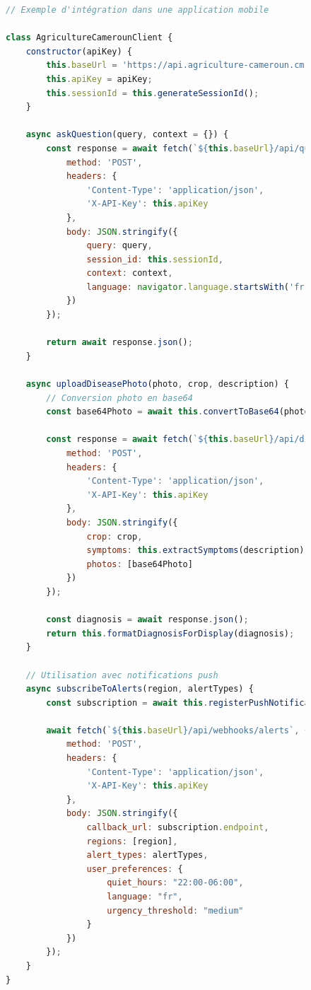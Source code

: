 \begin{figure}[H]
\centering
\begin{lstlisting}[language=JavaScript, caption=Intégration JavaScript de l'API]
// Exemple d'intégration dans une application mobile

class AgricultureCamerounClient {
    constructor(apiKey) {
        this.baseUrl = 'https://api.agriculture-cameroun.cm';
        this.apiKey = apiKey;
        this.sessionId = this.generateSessionId();
    }

    async askQuestion(query, context = {}) {
        const response = await fetch(`${this.baseUrl}/api/query`, {
            method: 'POST',
            headers: {
                'Content-Type': 'application/json',
                'X-API-Key': this.apiKey
            },
            body: JSON.stringify({
                query: query,
                session_id: this.sessionId,
                context: context,
                language: navigator.language.startsWith('fr') ? 'fr' : 'en'
            })
        });

        return await response.json();
    }

    async uploadDiseasePhoto(photo, crop, description) {
        // Conversion photo en base64
        const base64Photo = await this.convertToBase64(photo);

        const response = await fetch(`${this.baseUrl}/api/diagnose`, {
            method: 'POST',
            headers: {
                'Content-Type': 'application/json',
                'X-API-Key': this.apiKey
            },
            body: JSON.stringify({
                crop: crop,
                symptoms: this.extractSymptoms(description),
                photos: [base64Photo]
            })
        });

        const diagnosis = await response.json();
        return this.formatDiagnosisForDisplay(diagnosis);
    }

    // Utilisation avec notifications push
    async subscribeToAlerts(region, alertTypes) {
        const subscription = await this.registerPushNotifications();

        await fetch(`${this.baseUrl}/api/webhooks/alerts`, {
            method: 'POST',
            headers: {
                'Content-Type': 'application/json',
                'X-API-Key': this.apiKey
            },
            body: JSON.stringify({
                callback_url: subscription.endpoint,
                regions: [region],
                alert_types: alertTypes,
                user_preferences: {
                    quiet_hours: "22:00-06:00",
                    language: "fr",
                    urgency_threshold: "medium"
                }
            })
        });
    }
}


\end{lstlisting}
\end{figure}
